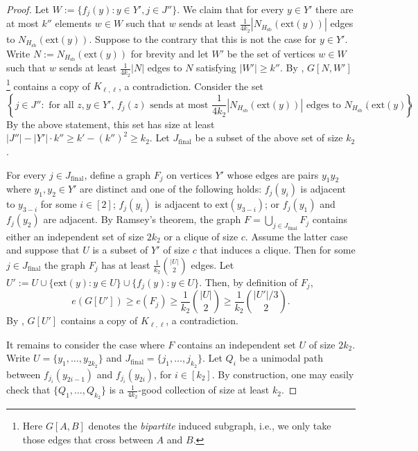 \documentclass[11pt,english]{article}
\theoremstyle{plain}
\theoremstyle{definition}
\theoremstyle{remark}
\newcommand{\sbb}{\mathrm{sb}}
\newcommand{\ext}{\mathrm{ext}}
\newcommand{\final}{\mathrm{final}}
\begin{document}
\begin{proof}
			Let $W := \{f_j(y) : y \in Y', j \in J''\}$. We claim that for every $y \in Y'$ there are at most $k''$ elements $w \in W$ such that $w$ sends at least $\frac{1}{4k_2}|N_{H_\sbb}(\ext(y))|$ edges to $N_{H_\sbb}(\ext(y))$. 
			Suppose to the contrary that this is not the case for $y \in Y'$. Write $N := N_{H_\sbb}(\ext(y))$ for brevity and let $W'$ be the set of vertices $w\in W$ such that $w$ sends at least $\frac{1}{4k_2}|N|$ edges to $N$ satisfying $|W'| \ge k''$. 
			By , $G[N, W']$\footnote{Here $G[A,B]$ denotes the \emph{bipartite} induced subgraph, i.e., we only take those edges that cross between $A$ and $B$.} contains a copy of $K_{\ell, \ell}$, a contradiction. 
			Consider the set 
			\begin{equation*}
				\left\{j \in J'' : \text{ for all $z,y\in Y'$, $f_j(z)$ sends at most $\frac{1}{4k_2}|N_{H_\sbb}(\ext(y))|$ edges to $N_{H_\sbb}(\ext(y))$}\right\}.
			\end{equation*}
			By the above statement, this set has size at least $|J''| - |Y'| \cdot k'' \ge k' - (k'')^2 \ge k_2$. Let $J_{\final}$ be a subset of the above set of size $k_2$.

			For every $j \in J_{\final}$, define a graph $F_j$ on vertices $Y'$ whose edges are pairs $y_1 y_2$ where $y_1, y_2 \in Y'$ are distinct and one of the following holds: $f_j(y_i)$ is adjacent to $y_{3-i}$ for some $i \in [2]$; $f_j(y_i)$ is adjacent to $\ext(y_{3-i})$; or $f_j(y_1)$ and $f_j(y_2)$ are adjacent. By Ramsey's theorem, the graph $F = \bigcup_{j \in J_{\final}}F_j$ contains either an independent set of size $2k_2$ or a clique of size $c$. 
			Assume the latter case and suppose that $U$ is a subset of $Y'$ of size $c$ that induces a clique. Then for some $j \in J_{\final}$ the graph $F_j$ has at least $\frac{1}{k_2}\binom{|U|}{2}$ edges. Let $U' := U \cup \{\ext(y) : y \in U\} \cup \{f_j(y) : y \in U\}$. Then, by definition of $F_j$, 
			\begin{equation*}
				e(G[U']) \ge e(F_j) \ge \frac{1}{k_2}\binom{|U|}{2} \ge \frac{1}{k_2} \binom{|U'|/3}{2}.
			\end{equation*}
			By , $G[U']$ contains a copy of $K_{\ell, \ell}$, a contradiction.

			It remains to consider the case where $F$ contains an independent set $U$ of size $2k_2$. Write $U = \{y_1, \ldots, y_{2k_2}\}$ and $J_{\final} = \{j_1, \ldots, j_{k_2}\}$. Let $Q_i$ be a unimodal path between $f_{j_i}(y_{2i-1})$ and $f_{j_i}(y_{2i})$, for $i \in [k_2]$. By construction, one may  easily check that $\{Q_1, \ldots, Q_{k_2}\}$ is a $\frac{1}{4k_2}$-good collection of size at least $k_2$.
        \end{proof}
\end{document}
